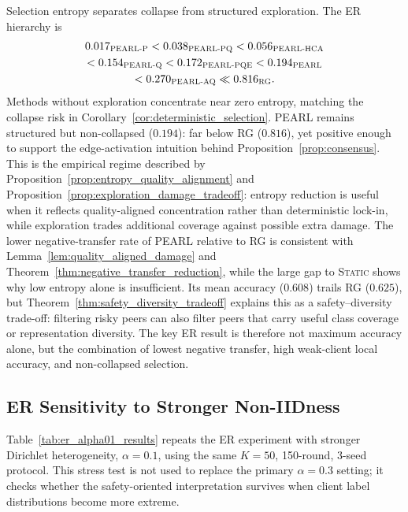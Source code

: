 \documentclass[conference]{IEEEtran}
\begin{document}
Selection entropy separates collapse from structured exploration. The ER hierarchy is
\begin{equation*}
\begin{gathered}
0.017_{\text{\scshape PEARL-P}} < 0.038_{\text{\scshape PEARL-PQ}} <
0.056_{\text{\scshape PEARL-HCA}}\\
< 0.154_{\text{\scshape PEARL-Q}} < 0.172_{\text{\scshape PEARL-PQE}} <
0.194_{\text{\scshape PEARL}}\\
< 0.270_{\text{\scshape PEARL-AQ}} \ll 0.816_{\text{\scshape RG}}.
\end{gathered}
\end{equation*}
Methods without exploration concentrate near zero entropy, matching the collapse risk in Corollary~\ref{cor:deterministic_selection}. \textsc{PEARL} remains structured but non-collapsed ($0.194$): far below \textsc{RG} ($0.816$), yet positive enough to support the edge-activation intuition behind Proposition~\ref{prop:consensus}. This is the empirical regime described by Proposition~\ref{prop:entropy_quality_alignment} and Proposition~\ref{prop:exploration_damage_tradeoff}: entropy reduction is useful when it reflects quality-aligned concentration rather than deterministic lock-in, while exploration trades additional coverage against possible extra damage. The lower negative-transfer rate of \textsc{PEARL} relative to \textsc{RG} is consistent with Lemma~\ref{lem:quality_aligned_damage} and Theorem~\ref{thm:negative_transfer_reduction}, while the large gap to \textsc{Static} shows why low entropy alone is insufficient. Its mean accuracy ($0.608$) trails \textsc{RG} ($0.625$), but Theorem~\ref{thm:safety_diversity_tradeoff} explains this as a safety--diversity trade-off: filtering risky peers can also filter peers that carry useful class coverage or representation diversity. The key ER result is therefore not maximum accuracy alone, but the combination of lowest negative transfer, high weak-client local accuracy, and non-collapsed selection.

\subsection{ER Sensitivity to Stronger Non-IIDness}
\label{subsec:er-alpha01}

Table~\ref{tab:er_alpha01_results} repeats the ER experiment with stronger Dirichlet heterogeneity, $\alpha=0.1$, using the same $K=50$, 150-round, 3-seed protocol. This stress test is not used to replace the primary $\alpha=0.3$ setting; it checks whether the safety-oriented interpretation survives when client label distributions become more extreme.
\end{document}
